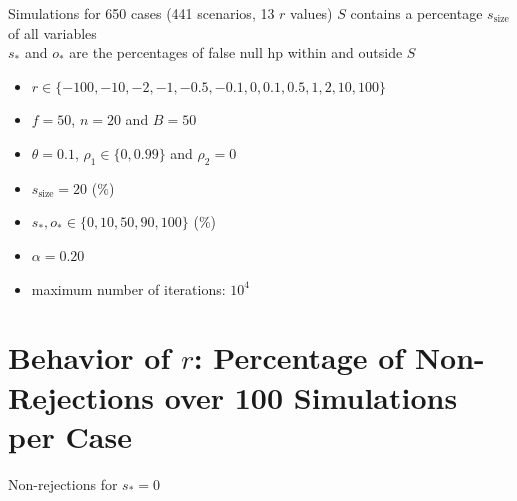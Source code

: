\documentclass[aspectratio=169]{beamer}
\begin{document}


\begin{frame}{Simulations for 650 cases (441 scenarios, 13 $r$ values)}
$S$ contains a percentage $s_{\text{size}}$ of all variables\\
$s_*$ and $o_*$ are the percentages of false null hp within and outside $S$

\vspace{3mm}
\begin{itemize}
\item $r\in\{-100,-10,-2,-1,-0.5,-0.1,0,0.1,0.5,1,2,10,100\}$
\item $f=50$, $n=20$ and $B=50$
\item $\theta=0.1$, $\rho_1\in\{0,0.99\}$ and $\rho_2=0$
\item $s_{\text{size}}=20$ ($\%$)
\item $s_*, o_*\in\{0, 10, 50, 90, 100\}$ ($\%$)
\item $\alpha=0.20$
\item maximum number of iterations: $10^4$
\end{itemize}
\end{frame}





\section{Behavior of $r$: Percentage of Non-Rejections over 100 Simulations per Case}
\begin{frame}{Non-rejections for $s_{*}=0$}
\begin{table}[h!]
\centering
{}
\end{table}
\end{frame}
\end{document}
